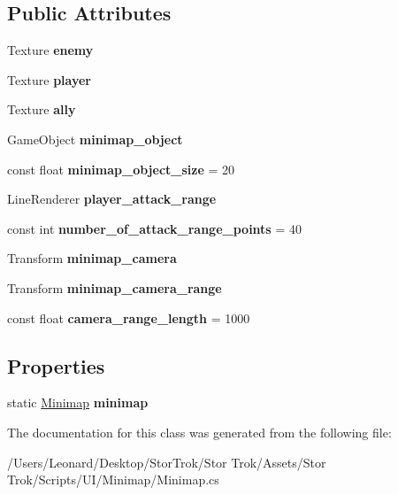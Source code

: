 \subsection*{Public Attributes}
\begin{DoxyCompactItemize}
\item 
\mbox{\label{class_minimap_a36deafcdb203f234551ed1fe2bb9f557}} 
Texture {\bfseries enemy}
\item 
\mbox{\label{class_minimap_a3586ee859abcf78c3929bfe474224d95}} 
Texture {\bfseries player}
\item 
\mbox{\label{class_minimap_a8a72cb7101c9ae06543511f9269d0b54}} 
Texture {\bfseries ally}
\item 
\mbox{\label{class_minimap_a8bcb3dee58defac9a40b22cd4234b7ab}} 
Game\+Object {\bfseries minimap\+\_\+object}
\item 
\mbox{\label{class_minimap_a7b9a24c2f296ac38de11c72fc5460e05}} 
const float {\bfseries minimap\+\_\+object\+\_\+size} = 20
\item 
\mbox{\label{class_minimap_a7eaf8d1c5242b1e38394344edf0d5af8}} 
Line\+Renderer {\bfseries player\+\_\+attack\+\_\+range}
\item 
\mbox{\label{class_minimap_aa0741c6e8c34b3a9eb0268aa412f16d4}} 
const int {\bfseries number\+\_\+of\+\_\+attack\+\_\+range\+\_\+points} = 40
\item 
\mbox{\label{class_minimap_ac35ee8e69cf5e93c504aefaf0b2b6d0d}} 
Transform {\bfseries minimap\+\_\+camera}
\item 
\mbox{\label{class_minimap_a0a2c7f72de980c606ce16cc03e9bdf17}} 
Transform {\bfseries minimap\+\_\+camera\+\_\+range}
\item 
\mbox{\label{class_minimap_a34ceb23acba0adfc0939139a171032cd}} 
const float {\bfseries camera\+\_\+range\+\_\+length} = 1000
\end{DoxyCompactItemize}
\subsection*{Properties}
\begin{DoxyCompactItemize}
\item 
\mbox{\label{class_minimap_acf0ff370a30f4c5a55a424fb18b91483}} 
static \hyperlink{class_minimap}{Minimap} {\bfseries minimap}
\end{DoxyCompactItemize}


The documentation for this class was generated from the following file\+:\begin{DoxyCompactItemize}
\item 
/\+Users/\+Leonard/\+Desktop/\+Stor\+Trok/\+Stor Trok/\+Assets/\+Stor Trok/\+Scripts/\+U\+I/\+Minimap/Minimap.\+cs\end{DoxyCompactItemize}
